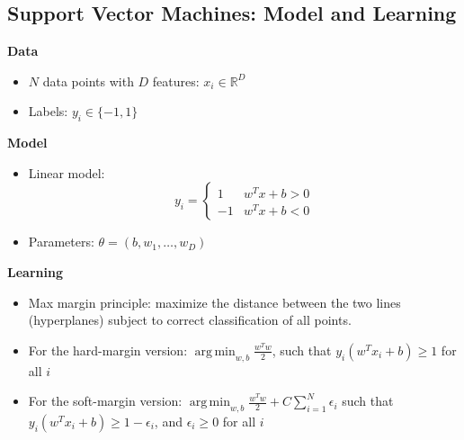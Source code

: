 \documentclass[10pt]{article}
\DeclareMathOperator*{\argmin}{arg\,min}
\begin{document}
\subsection*{Support Vector Machines: Model and Learning}
\textbf{Data}
\begin{itemize}
	\item $N$ data points with $D$ features: $x_i \in \mathbb{R}^D$
	\item Labels: $y_i \in \{-1, 1\}$
\end{itemize}
\textbf{Model}
\begin{itemize}
	\item Linear model:
	\[y_i = \begin{cases} 1 & w^T x + b > 0 \\ -1 & w^Tx + b < 0 \end{cases}\]
    \item Parameters: $\theta = (b, w_1, \dots, w_D)$
\end{itemize}
\textbf{Learning}
\begin{itemize}
	\item Max margin principle: maximize the distance between the two lines (hyperplanes) subject to correct classification of all points.
	\item For the hard-margin version: $\argmin_{w, b} \frac{w^T w}{2}$, such that $y_i (w^T x_i + b) \geq 1$ for all $i$
	\item For the soft-margin version: $\argmin_{w, b} \frac{w^T w}{2} + C \sum_{i = 1}^N \epsilon_i$ such that $y_i(w^T x_i + b) \geq 1 - \epsilon_i$, and $\epsilon_i \geq 0$ for all $i$
\end{itemize}
\end{document}
